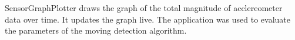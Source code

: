 SensorGraphPlotter draws the graph of the total magnitude of acclereometer data over time. It updates the graph live. The application was used to evaluate the parameters of the moving detection algorithm.
